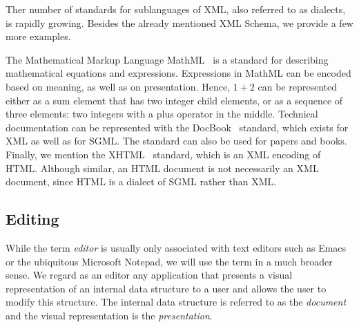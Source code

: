 
Ther number of standards for sublanguages of XML, also referred to as dialects, is rapidly growing. Besides the already mentioned XML Schema, we provide a few more examples.

The Mathematical Markup Language MathML~\cite{mathml20} is a standard for describing mathematical equations and expressions.  \bc Expressions in MathML can be encoded based on  meaning, as well as on presentation. Hence, $1+2$ can be represented either as a sum  element that has two integer child elements, or as a sequence of three elements: two integers with a plus operator in the middle.  \ec Technical documentation can be represented with the DocBook~\cite{walsh02docbook} standard, which exists for XML as well as for SGML. The standard can also be used for papers and books. Finally, we mention the XHTML~\cite{xhtml11} standard, which is an XML encoding of HTML. Although similar, an HTML document is not necessarily an XML document, since HTML is a dialect of SGML rather than XML.





\subsection{Editing}
\label{sect:editing}


While the term {\em editor} is usually only associated with text editors such as Emacs~\cite{stallman81emacs} or the ubiquitous Microsoft Notepad, we will use the term in a much broader sense. We regard as an editor any application that presents a visual representation of an internal data structure to a user and allows the user to modify this structure. The internal data structure is referred to as the {\em document} and the visual representation is the {\em presentation}. 

